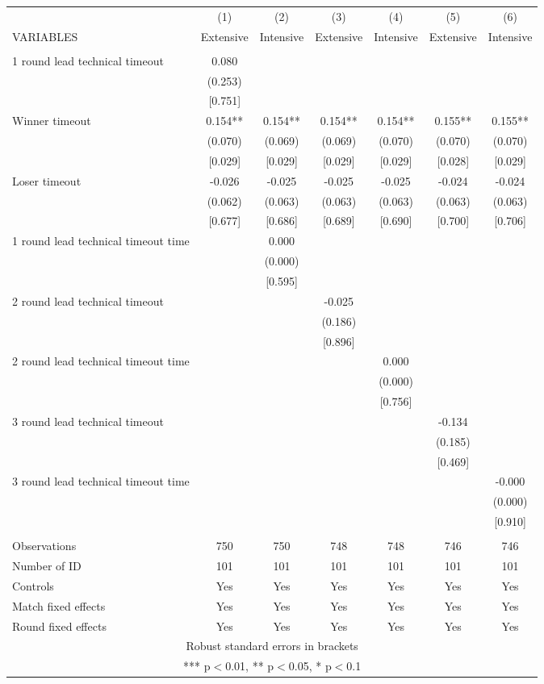 \documentclass[]{article}
\begin{document}
\begin{tabular}{lcccccc} \hline
 & (1) & (2) & (3) & (4) & (5) & (6) \\
VARIABLES & Extensive & Intensive & Extensive & Intensive & Extensive & Intensive \\ \hline
 &  &  &  &  &  &  \\
1 round lead technical timeout & 0.080 &  &  &  &  &  \\
 & (0.253) &  &  &  &  &  \\
 & [0.751] &  &  &  &  &  \\
Winner timeout & 0.154** & 0.154** & 0.154** & 0.154** & 0.155** & 0.155** \\
 & (0.070) & (0.069) & (0.069) & (0.070) & (0.070) & (0.070) \\
 & [0.029] & [0.029] & [0.029] & [0.029] & [0.028] & [0.029] \\
Loser timeout & -0.026 & -0.025 & -0.025 & -0.025 & -0.024 & -0.024 \\
 & (0.062) & (0.063) & (0.063) & (0.063) & (0.063) & (0.063) \\
 & [0.677] & [0.686] & [0.689] & [0.690] & [0.700] & [0.706] \\
1 round lead technical timeout time &  & 0.000 &  &  &  &  \\
 &  & (0.000) &  &  &  &  \\
 &  & [0.595] &  &  &  &  \\
2 round lead technical timeout &  &  & -0.025 &  &  &  \\
 &  &  & (0.186) &  &  &  \\
 &  &  & [0.896] &  &  &  \\
2 round lead technical timeout time &  &  &  & 0.000 &  &  \\
 &  &  &  & (0.000) &  &  \\
 &  &  &  & [0.756] &  &  \\
3 round lead technical timeout &  &  &  &  & -0.134 &  \\
 &  &  &  &  & (0.185) &  \\
 &  &  &  &  & [0.469] &  \\
3 round lead technical timeout time &  &  &  &  &  & -0.000 \\
 &  &  &  &  &  & (0.000) \\
 &  &  &  &  &  & [0.910] \\
 &  &  &  &  &  &  \\
Observations & 750 & 750 & 748 & 748 & 746 & 746 \\
Number of ID & 101 & 101 & 101 & 101 & 101 & 101 \\
Controls & Yes & Yes & Yes & Yes & Yes & Yes \\
Match fixed effects & Yes & Yes & Yes & Yes & Yes & Yes \\
 Round fixed effects & Yes & Yes & Yes & Yes & Yes & Yes \\ \hline
\multicolumn{7}{c}{ Robust standard errors in brackets} \\
\multicolumn{7}{c}{ *** p$<$0.01, ** p$<$0.05, * p$<$0.1} \\
\end{tabular}
\end{document}
